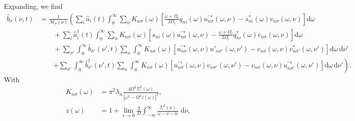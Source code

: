 Expanding, we find
\begin{equation}
\begin{split}
\hat{b}_\sigma(\nu,t) 
&= \frac{1}{\mathcal{M}_\sigma(\nu)}\left(\sum_i\hat{a}_i(t)\int_0^\infty\sum_n K_{n\sigma}(\omega)\left[\frac{\omega + \Omega_i}{2\Omega_i}q_{ni}(\omega)u_{n\sigma}^{\prime*}(\omega,\nu) - s_{ni}^*(\omega)v_{n\sigma}(\omega,\nu)\right]\mathrm{d}\omega\right.\\
&\qquad + \sum_i\hat{a}_i^\dagger(t)\int_0^\infty\sum_nK_{n\sigma}(\omega)\left[s_{ni}(\omega)u_{n\sigma}^{\prime*}(\omega,\nu) - \frac{\omega + \Omega_i}{2\Omega_i}q_{ni}^*(\omega)v_{n\sigma}(\omega,\nu)\right]\mathrm{d}\omega\\
&\qquad + \sum_{\sigma'}\int_0^\infty\hat{b}_{\sigma'}(\nu',t)\sum_n\int_0^\infty K_{n\sigma}(\omega)\left[u_{n\sigma}^{\prime*}(\omega,\nu)u'_{n\sigma'}(\omega,\nu') - v_{n\sigma}(\omega,\nu)v_{n\sigma'}^*(\omega,\nu')\right]\mathrm{d}\omega\,\mathrm{d}\nu'\\
&\qquad\left. + \sum_{\sigma'}\int_0^\infty\hat{b}_{\sigma'}^\dagger(\nu',t)\sum_n\int_0^\infty K_{n\sigma}(\omega)\left[u_{n\sigma}^{\prime*}(\omega,\nu)v_{n\sigma'}(\omega,\nu') - v_{n\sigma}(\omega,\nu)u_{n\sigma'}^{\prime*}(\omega,\nu')\right]\mathrm{d}\omega\,\mathrm{d}\nu'\right).
\end{split}
\end{equation}
With
\begin{equation}
\begin{split}
K_{n\sigma}(\omega) &= \pi^2\lambda_n\frac{4\Omega^2\Sigma^2(\omega)}{|\omega^2 - \Omega^2z(\omega)|^2},\\
z(\omega) &= 1 + \lim_{\epsilon\to0}\frac{2}{\Omega}\int_{-\infty}^\infty\frac{\Sigma^2(\nu)}{\omega - \nu - \mathrm{i}\epsilon}\;\mathrm{d}\nu,
\end{split}
\end{equation}
